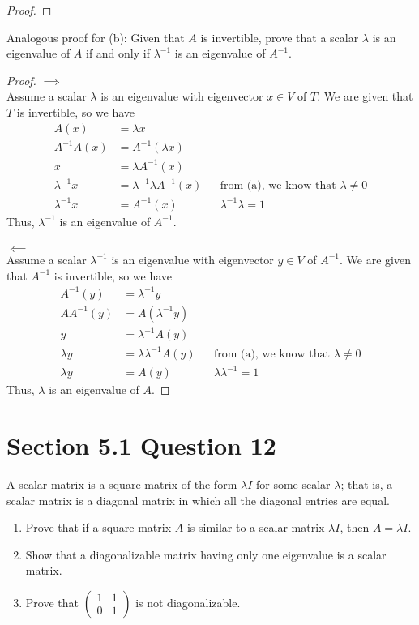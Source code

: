 \documentclass[13pt]{article}
\begin{document}
\begin{enumerate}[label=(\alph*),leftmargin=*]
\begin{proof}
  \end{proof}
  Analogous proof for (b): Given that $A$ is invertible, prove that a scalar $\lambda$ is an eigenvalue of $A$ if and only if $\lambda^{-1}$ is an eigenvalue of $A^{-1}$.
  \begin{proof}
    $\implies$ \\
    Assume a scalar $\lambda$ is an eigenvalue with eigenvector $x \in V$ of $T$. We are given that $T$ is invertible, so we have
    \begin{align*}
      A(x) &= \lambda x \\
      A^{-1}A(x) &= A^{-1}(\lambda x) \\
      x &= \lambda A^{-1}(x) \\
      \lambda^{-1} x &= \lambda^{-1}\lambda A^{-1}(x) && \text{from (a), we know that } \lambda \neq 0 \\
      \lambda^{-1} x &= A^{-1}(x) && \lambda^{-1}\lambda = 1
    \end{align*}
    Thus, $\lambda^{-1}$ is an eigenvalue of $A^{-1}$. \\ \\
    $\impliedby$ \\
    Assume a scalar $\lambda^{-1}$ is an eigenvalue with eigenvector $y \in V$ of $A^{-1}$. We are given that $A^{-1}$ is invertible, so we have
    \begin{align*}
      A^{-1}(y) &= \lambda^{-1} y \\
      AA^{-1}(y) &= A(\lambda^{-1} y) \\
      y &= \lambda^{-1}A(y) \\
      \lambda y &= \lambda\lambda^{-1} A(y) && \text{from (a), we know that } \lambda \neq 0 \\
      \lambda y &= A(y) && \lambda\lambda^{-1} = 1
    \end{align*}
    Thus, $\lambda$ is an eigenvalue of $A$.
  \end{proof}
\end{enumerate}





\newpage
\section*{Section 5.1 Question 12}
A scalar matrix is a square matrix of the form $\lambda I$ for some scalar $\lambda$; that is, a scalar matrix is a diagonal matrix in which all the diagonal entries are equal.

\begin{enumerate}[label=(\alph*),leftmargin=*]
\item Prove that if a square matrix $A$ is similar to a scalar matrix $\lambda I$,
  then $A = \lambda I$.
\item Show that a diagonalizable matrix having only one eigenvalue is a scalar matrix.
\item Prove that $
  \begin{pmatrix}
    1 & 1 \\
    0 & 1
  \end{pmatrix}$
  is not diagonalizable.
\end{enumerate}
\end{document}
